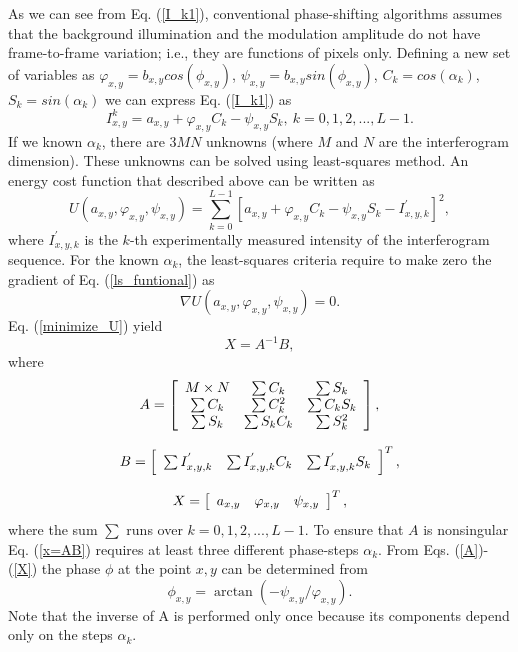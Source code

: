 \documentclass[letterpaper,12pt]{article}   %
\begin{document}
As we can see from Eq. (\ref{I_k1}), conventional phase-shifting algorithms assumes that
the background illumination and the modulation amplitude do not have frame-to-frame
variation; i.e., they are functions of pixels only. Defining a new set of variables as
$\varphi_{x,y}=b_{x,y}cos(\phi_{x,y})$, $\psi_{x,y}=b_{x,y}sin(\phi_{x,y})$,
$C_k=cos(\alpha_k)$, $S_k=sin(\alpha_k)$ we can express Eq. (\ref{I_k1}) as
\begin{equation}\label{I_k2}
	I_{x,y}^k=a_{x,y}+\varphi_{x,y}C_k-\psi_{x,y}S_k,\: k=0,1,2,...,L-1.
\end{equation}
If we known $\alpha_k$, there are $3MN$ unknowns (where $M$ and $N$ are the interferogram
dimension). These unknowns can be solved using least-squares method. An energy cost 
function that described above can be written as
\begin{equation}\label{ls_funtional}
	U(a_{x,y},\varphi_{x,y},\psi_{x,y})=\sum_{k=0}^{L-1}
	[a_{x,y}+\varphi_{x,y}C_k-\psi_{x,y}S_k-I_{x,y,k}^{'}]^2,
\end{equation}
where $I_{x,y,k}^{'}$ is the $k$-th experimentally measured intensity of the 
interferogram sequence. For the known $\alpha_k$, the least-squares criteria require to 
make zero the gradient of Eq. (\ref{ls_funtional}) as
\begin{equation}\label{minimize_U}
	\nabla U(a_{x,y},\varphi_{x,y},\psi_{x,y})=0.
\end{equation}
Eq. (\ref{minimize_U}) yield
\begin{equation}\label{x=AB}
	X = A^{-1} B,
\end{equation}
where
\begin{equation}\label{A}
	A = \left[ \begin{array}{c c c}
	M\times N & \sum C_k     & \sum S_k \\
	\sum C_k  & \sum C_k^2   & \sum C_k S_k \\
	\sum S_k  & \sum S_k C_k & \sum S_k^2\end{array} \right],
\end{equation}

\begin{equation}\label{B}
	B = \left[ \begin{array}{c c c}
	\sum I_{x,y,k}^{'} & \sum I_{x,y,k}^{'} C_k & \sum I_{x,y,k}^{'} S_k \end{array}
	\right]^T,
\end{equation}

\begin{equation}\label{X}
	X = \left[ \begin{array}{c c c}
	a_{x,y} & \varphi_{x,y} & \psi_{x,y} \end{array} \right]^T,
\end{equation}
where the sum $\sum$ runs over $k=0,1,2,...,L-1$. To ensure that $A$ is nonsingular Eq.
(\ref{x=AB}) requires at least three different phase-steps $\alpha_k$. From Eqs.
(\ref{A})-(\ref{X}) the phase $\phi$ at the point $x,y$ can be determined from
\begin{equation}
	\phi_{x,y} = \arctan(-\psi_{x,y}/\varphi_{x,y}).
\end{equation}
Note that the inverse of A is performed only once because its components depend only on
the steps $\alpha_k$.
\end{document}
